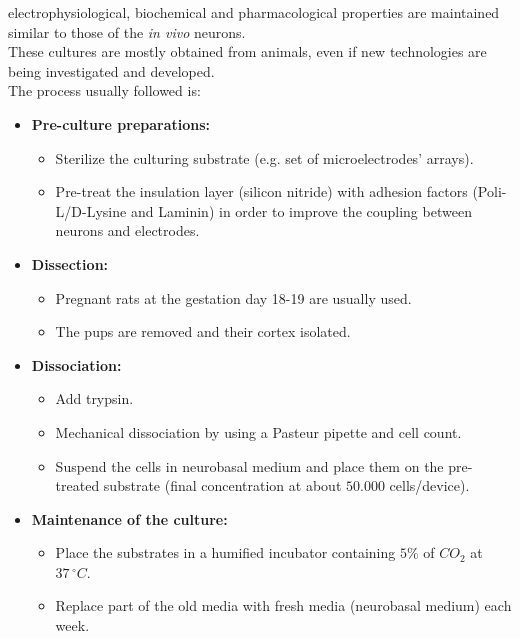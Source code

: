 electrophysiological, biochemical and pharmacological properties are
maintained similar to those of the \textit{in vivo} neurons.\\
These cultures are mostly obtained from animals, even if new technologies
are being investigated and developed.\\
The process usually followed is:
\begin{itemize}
      \item \textbf{Pre-culture preparations:}
            \begin{itemize}
                  \item Sterilize the culturing substrate (e.g. set of
                        microelectrodes' arrays).
                  \item Pre-treat the insulation layer (silicon nitride) with
                        adhesion factors (Poli-L/D-Lysine and Laminin) in order to improve the
                        coupling between neurons and electrodes.
            \end{itemize}
      \item \textbf{Dissection:}
            \begin{itemize}
                  \item Pregnant rats at the gestation day 18-19 are usually used.
                  \item The pups are removed and their cortex isolated.
            \end{itemize}
      \item \textbf{Dissociation:}
            \begin{itemize}
                  \item Add trypsin.
                  \item Mechanical dissociation by using a Pasteur pipette and cell
                        count.
                  \item Suspend the cells in neurobasal medium and place them on the
                        pre-treated substrate (final concentration at about \(50.000\) cells/device).
            \end{itemize}
      \item \textbf{Maintenance of the culture:}
            \begin{itemize}
                  \item Place the substrates in a humified incubator containing \(5\%\)
                        of \(CO_2\) at \(37\,{}^{\circ}C\).
                  \item Replace part of the old media with fresh media (neurobasal
                        medium) each week.
            \end{itemize}
\end{itemize}
